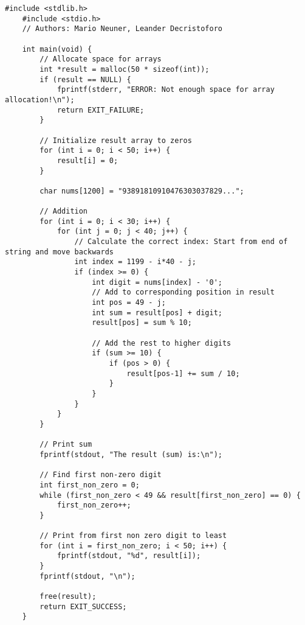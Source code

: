 \documentclass[12pt,a4paper]{article}
\begin{document}
\begin{lstlisting}[caption={Addition},label={lst:p7001}]
    #include <stdlib.h>
    #include <stdio.h>
    // Authors: Mario Neuner, Leander Decristoforo

    int main(void) {
        // Allocate space for arrays
        int *result = malloc(50 * sizeof(int));
        if (result == NULL) {
            fprintf(stderr, "ERROR: Not enough space for array allocation!\n");
            return EXIT_FAILURE;
        }
        
        // Initialize result array to zeros
        for (int i = 0; i < 50; i++) {
            result[i] = 0;
        }
        
        char nums[1200] = "93891810910476303037829...";
        
        // Addition
        for (int i = 0; i < 30; i++) {
            for (int j = 0; j < 40; j++) {
                // Calculate the correct index: Start from end of string and move backwards
                int index = 1199 - i*40 - j;
                if (index >= 0) {
                    int digit = nums[index] - '0';
                    // Add to corresponding position in result
                    int pos = 49 - j;
                    int sum = result[pos] + digit;
                    result[pos] = sum % 10;
                    
                    // Add the rest to higher digits
                    if (sum >= 10) {
                        if (pos > 0) {
                            result[pos-1] += sum / 10;
                        }
                    }
                }
            }
        }
        
        // Print sum
        fprintf(stdout, "The result (sum) is:\n");
        
        // Find first non-zero digit
        int first_non_zero = 0;
        while (first_non_zero < 49 && result[first_non_zero] == 0) {
            first_non_zero++;
        }
        
        // Print from first non zero digit to least
        for (int i = first_non_zero; i < 50; i++) {
            fprintf(stdout, "%d", result[i]);
        }
        fprintf(stdout, "\n");
        
        free(result);
        return EXIT_SUCCESS;
    }
\end{lstlisting}
    
\vspace{10em}
\end{document}
